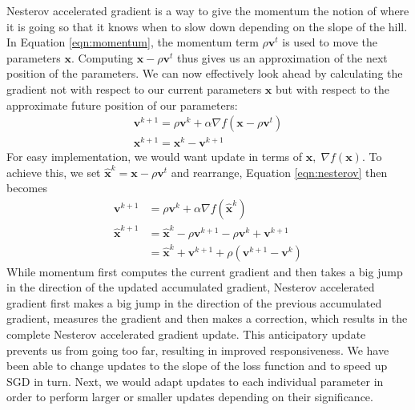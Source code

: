 \documentclass[12pt]{report}
\numberwithin{equation}{section}
\begin{document}
Nesterov accelerated gradient {\cite{nesterov1983method}} is a way to give the momentum the notion of where it is going so that it knows when to slow down depending on the slope of the hill.  In Equation \ref{eqn:momentum}, the momentum term $\rho \bm{v}^{t}$ is used to move the parameters $\bm{x}$. Computing $\bm{x} - \rho \bm{v}^{t}$ thus gives us an approximation of the next position of the parameters. We can now effectively look ahead by calculating the gradient not with respect to our current parameters $\bm{x}$ but with respect to the approximate future position of our parameters:
\begin{equation}
\begin{array}{l}\label{eqn:nesterov}
\bm{v}^{k+1} = \rho \bm{v}^{k} + \alpha \nabla f(\bm{x} - \rho \bm{v}^{t}) \\
\bm{x}^{k+1} = \bm{x}^{k}- \bm{v}^{k+1}
\end{array}
\end{equation} \noindent
For easy implementation, we would want update in terms of $\bm{x}, \; \nabla f(\bm{x})$. To achieve this, we set $\hat{\bm{x}}^k = \bm{x} - \rho \bm{v}^{t}$ and rearrange, Equation \ref{eqn:nesterov} then becomes
\begin{equation}
\begin{array}{ll}\label{eqn:nesterov_e}
\bm{v}^{k+1} &= \rho \bm{v}^{k} + \alpha \nabla f(\hat{\bm{x}}^k) \\
\hat{\bm{x}}^{k+1} &= \hat{\bm{x}}^k - \rho \bm{v}^{k+1} - \rho \bm{v}^{k} + \bm{v}^{k+1} \\
			 &= \hat{\bm{x}}^k + \bm{v}^{k+1} + \rho(\bm{v}^{k+1} - \bm{v}^{k})
\end{array}
\end{equation} \noindent
While momentum first computes the current gradient and then takes a big jump in the direction of the updated accumulated gradient, Nesterov accelerated gradient first makes a big jump in the direction of the previous accumulated gradient, measures the gradient and then makes a correction, which results in the complete Nesterov accelerated gradient update. This anticipatory update prevents us from going too far, resulting in improved responsiveness. We have been able to change updates to the slope of the loss function and to speed up SGD in turn. Next, we would adapt updates to each individual parameter in order to perform larger or smaller updates depending on their significance. 
\end{document}
